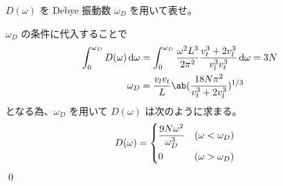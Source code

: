 \documentclass[uplatex,dvipdfmx,a4paper,11pt]{jlreq}
\makeatletter
\numberwithin{equation}{section}
\theoremstyle{definition}
\renewenvironment{proof}[1][\proofname]{\par
  \normalfont
  \topsep6\p@\@plus6\p@ \trivlist
  \item[\hskip\labelsep{\bfseries #1}\@addpunct{\bfseries}]\ignorespaces\quad\par
}{%
  \qed\endtrivlist\@endpefalse
}
\renewcommand\proofname{証明}
\makeatother
\begin{document}
\begin{problem}
$D(\omega)$ を Debye 振動数 $\omega_D$ を用いて表せ。
\end{problem}
\begin{proof}
  $\omega_D$ の条件に代入することで
  \begin{align}
    \int_0^{\omega_D}D(\omega)\dl{\omega} & = \int_0^{\omega_D}\frac{\omega^2 L^3}{2\pi^2}\frac{v_t^3 + 2v_l^3}{v_l^3v_t^3}\dl{\omega} = 3N \\
    \omega_D                              & = \frac{v_lv_t}{L}\ab(\frac{18N\pi^2}{v_t^3 + 2v_l^3})^{1/3}
  \end{align}
  となる為、$\omega_D$ を用いて $D(\omega)$ は次のように求まる。
  \begin{align}
    D(\omega) & = \begin{dcases}
                    \frac{9N\omega^2}{\omega_D^3} & (\omega < \omega_D) \\
                    0                             & (\omega > \omega_D)
                  \end{dcases}
  \end{align}
\end{proof}
\end{document}
